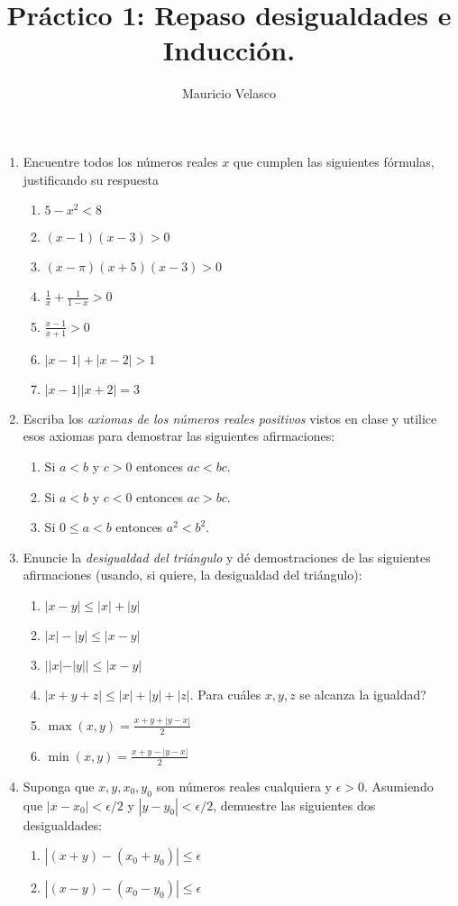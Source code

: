 \documentclass[12pt, a4paper]{article}
\date{}
\begin{document}
\title{Pr\'actico 1: Repaso desigualdades e Inducción.}
\author{Mauricio Velasco}
\maketitle{}
\begin{enumerate} 
\item Encuentre todos los números reales $x$ que cumplen las siguientes fórmulas, justificando su respuesta

\begin{enumerate}
\item $5-x^2<8$
\item $(x-1)(x-3)>0$
\item $(x-\pi)(x+5)(x-3)>0$
\item $\frac{1}{x}+\frac{1}{1-x}>0$
\item $\frac{x-1}{x+1}>0$
\item $|x-1|+|x-2|>1$
\item $|x-1||x+2|=3$
\end{enumerate}

\item Escriba los \emph{axiomas de los números reales positivos} vistos en clase y utilice esos axiomas para demostrar las siguientes afirmaciones:
\begin{enumerate}
\item Si $a<b$ y $c>0$ entonces $ac<bc$.
\item Si $a<b$ y $c<0$ entonces $ac>bc$.
\item Si $0\leq a<b$ entonces $a^2<b^2$.
\end{enumerate}

\item Enuncie la \emph{desigualdad del triángulo} y dé demostraciones de las siguientes afirmaciones (usando, si quiere, la desigualdad del triángulo):
\begin{enumerate}
\item $|x-y|\leq |x|+|y|$
\item $|x|-|y|\leq |x-y|$
\item $||x|-|y||\leq |x-y|$ 
\item $|x+y+z|\leq |x|+|y|+|z|$. Para cuáles $x,y,z$ se alcanza la igualdad? 
\item $\max(x,y)=\frac{x+y+|y-x|}{2}$
\item $\min(x,y)=\frac{x+y-|y-x|}{2}$
\end{enumerate}

\item Suponga que $x,y,x_0,y_0$ son números reales cualquiera y $\epsilon>0$. 
Asumiendo que $|x-x_0|<\epsilon/2$ y $|y-y_0|<\epsilon/2$, demuestre las siguientes dos desigualdades:
\begin{enumerate}
\item $|(x+y)-(x_0+y_0)|\leq \epsilon$
\item $|(x-y)-(x_0-y_0)|\leq \epsilon$
\end{enumerate}
  

\end{enumerate}
\end{document}

